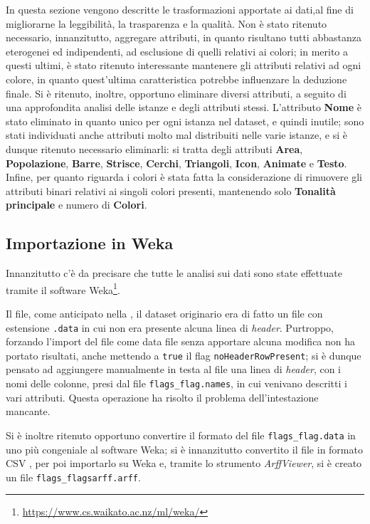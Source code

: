 \documentclass[a4paper,11pt,twoside,notitlepage,final]{scrartcl}
\begin{document}
In questa sezione vengono descritte le trasformazioni apportate ai dati,al fine di migliorarne la leggibilità, la trasparenza e la qualità.
Non è stato ritenuto necessario, innanzitutto, aggregare attributi, in quanto risultano tutti abbastanza eterogenei ed indipendenti, ad esclusione di quelli relativi ai colori;
in merito a questi ultimi, è stato ritenuto interessante mantenere gli attributi relativi ad ogni colore, in quanto quest'ultima caratteristica potrebbe influenzare la deduzione finale.
Si è ritenuto, inoltre, opportuno eliminare diversi attributi, a seguito di una approfondita analisi delle istanze e degli attributi stessi.
L'attributo \textbf{Nome} è stato eliminato in quanto unico per ogni istanza nel dataset, e quindi inutile; sono stati individuati anche attributi molto mal distribuiti nelle varie istanze,
e si è dunque ritenuto necessario eliminarli: si tratta degli attributi \textbf{Area}, \textbf{Popolazione}, \textbf{Barre}, \textbf{Strisce}, \textbf{Cerchi}, \textbf{Triangoli}, \textbf{Icon}, \textbf{Animate} e \textbf{Testo}.
Infine, per quanto riguarda i colori è stata fatta la considerazione di rimuovere gli attributi binari relativi ai singoli colori presenti, mantenendo solo \textbf{Tonalità principale} e numero di \textbf{Colori}.

\subsection{Importazione in Weka}

Innanzitutto c'è da precisare che tutte le analisi sui dati sono state effettuate tramite il software Weka\footnote{\url{https://www.cs.waikato.ac.nz/ml/weka/}}.

Il file, come anticipato nella , il dataset originario era di fatto un file con estensione \texttt{.data} in cui non era presente alcuna linea di \emph{header}.
Purtroppo, forzando l'import del file come data file senza apportare alcuna modifica non ha portato risultati, anche mettendo a \texttt{true} il flag \texttt{noHeaderRowPresent};
si è dunque pensato ad aggiungere manualmente in testa al file una linea di \emph{header}, con i nomi delle colonne, presi dal file \texttt{flags\_flag.names}, in cui venivano descritti i vari attributi.
Questa operazione ha risolto il problema dell'intestazione mancante.

Si è inoltre ritenuto opportuno convertire il formato del file \texttt{flags\_flag.data} in uno più congeniale al software Weka; si è innanzitutto convertito il file in formato CSV
, per poi importarlo su Weka e, tramite lo strumento \emph{ArffViewer}, si è creato un file \texttt{flags\_flagsarff.arff}.
\end{document}
